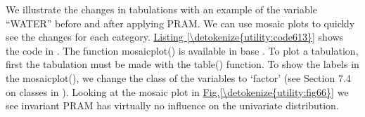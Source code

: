 \documentclass[letterpaper,10pt,english]{sphinxmanual}
\begin{document}
We illustrate the changes in tabulations with an example of the variable
“WATER” before and after applying PRAM. We can use mosaic plots to
quickly see the changes for each category. \hyperref[\detokenize{utility:code613}]{Listing \ref{\detokenize{utility:code613}}} shows the code
in . The function mosaicplot() is available in base . To plot a
tabulation, first the tabulation must be made with the table() function.
To show the labels in the mosaicplot(), we change the class of the
variables to ‘factor’ (see Section 7.4 on classes in ). Looking at
the mosaic plot in \hyperref[\detokenize{utility:fig66}]{Fig.\@ \ref{\detokenize{utility:fig66}}} we see invariant PRAM has virtually no
influence on the univariate distribution.

\def\sphinxLiteralBlockLabel{\label{\detokenize{utility:code613}}}
%
\end{document}
